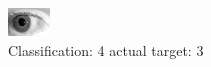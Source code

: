 \begin{figure}[h!]
\begin{center}
\includegraphics[width=0.60\columnwidth]{figures/ID309_class_4_target_3.png}
\end{center}
\caption{ Classification: 4 actual target: 3}
\label{fig:ID309_class_4_target_3}
\end{figure}
